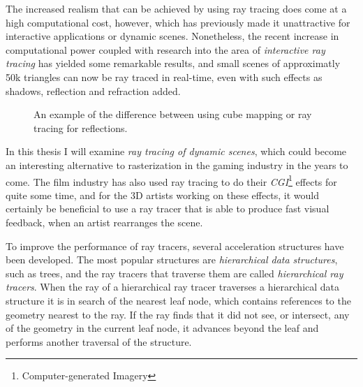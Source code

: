 


The increased realism that can be achieved by using ray tracing does come at a
high computational cost, however, which has previously made it unattractive for
interactive applications or dynamic scenes. Nonetheless, the recent increase in
computational power coupled with research into the area of \textit{interactive
  ray tracing} has yielded some remarkable results, and small scenes of
approximatly 50k triangles can now be ray traced in real-time, even with such
effects as shadows, reflection and refraction added.

\begin{figure}
  \centering
  \hspace{10pt}
  \caption[Reflections created with cube mapping and ray tracing.]{An example of
    the difference between using cube mapping or ray tracing for
    reflections.}
  \label{fig:reflectingDragons}
\end{figure}



In this thesis I will examine \textit{ray tracing of dynamic scenes}, which
could become an interesting alternative to rasterization in the gaming industry
in the years to come. The film industry has also used ray tracing to do their
\textit{CGI}\footnote{Computer-generated Imagery} effects for quite some time,
and for the 3D artists working on these effects, it would certainly be
beneficial to use a ray tracer that is able to produce fast visual feedback,
when an artist rearranges the scene.


To improve the performance of ray tracers, several acceleration
structures have been developed. The most popular structures are
\textit{hierarchical data structures}, such as trees, and the ray
tracers that traverse them are called \textit{hierarchical ray
  tracers}. When the ray of a hierarchical ray tracer traverses a
hierarchical data structure it is in search of the nearest leaf node,
which contains references to the geometry nearest to the ray. If the
ray finds that it did not see, or intersect, any of the geometry in
the current leaf node, it advances beyond the leaf and performs
another traversal of the structure.

